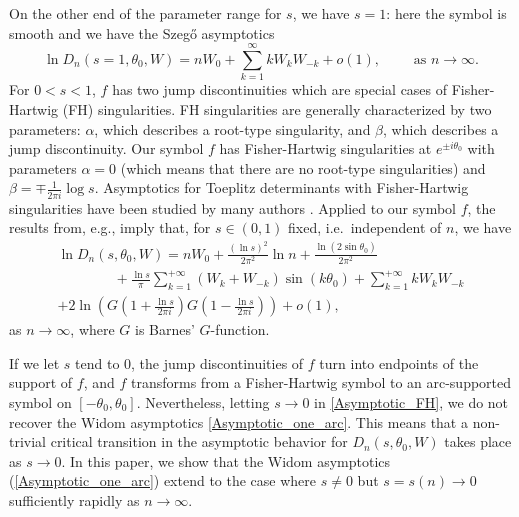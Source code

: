 \documentclass[11pt,fleqn]{article}
\numberwithin{equation}{section}
\begin{document}
On the other end of the parameter range for $s$, we have $s=1$: here the symbol is smooth and we have the Szeg\H{o} asymptotics
\begin{equation} \label{Asymptotic_Szego}
\ln D_n \left(s=1, \theta_{0}, W \right) = nW_0+\sum_{k=1}^{\infty}kW_kW_{-k}+ o(1), \qquad \mbox{ as } n \to \infty.
\end{equation}
For $0 < s < 1$, $f$ has two jump discontinuities which are special cases of Fisher-Hartwig (FH) singularities. FH singularities are generally characterized by two parameters: $\alpha$, which describes a root-type singularity, and $\beta$, which describes a jump discontinuity. Our symbol $f$ has Fisher-Hartwig singularities at $e^{\pm i\theta_0}$ with parameters $\alpha=0$ (which means that there are no root-type singularities) and $\beta=\mp \frac{1}{2\pi i} \log s$.
Asymptotics for Toeplitz determinants with Fisher-Hartwig singularities have been studied by many authors \cite{FH, W, Basor, Basor2, BS, Ehr, Deift2, DeiftItsKrasovsky}. Applied to our symbol $f$, the results from, e.g., \cite{Deift2} imply that, for $s\in (0,1)$ fixed, i.e.\ independent of $n$, we have
\begin{multline} \label{Asymptotic_FH}
\ln D_n \left(s,\theta_{0},W \right) = nW_0 + \frac{(\ln s)^2}{2 \pi^{2}}  \ln n +\frac{\ln(2\sin\theta_0)}{2\pi^2} \\
\qquad\qquad +\frac{\ln s}{\pi} \sum_{k=1}^{+\infty}(W_k+W_{-k}) \sin(k\theta_0) 
+ \sum_{k=1}^{+\infty}kW_kW_{-k}\\
+2\ln\left(G\left(1+\frac{\ln s}{2\pi i}\right)G\left(1-\frac{\ln s}{2\pi i}\right)\right) + o(1),
\end{multline}
as $n\to\infty$, where $G$ is Barnes' $G$-function.



If we let $s$ tend to $0$, the jump discontinuities of $f$ turn into endpoints of the support of $f$, and $f$ transforms from a Fisher-Hartwig symbol to an arc-supported symbol on $[-\theta_0,\theta_0]$. Nevertheless, letting $s\to 0$ in \eqref{Asymptotic_FH}, we do not recover the Widom asymptotics \eqref{Asymptotic_one_arc}. This means that a non-trivial critical transition in the asymptotic behavior for $D_n(s,\theta_0,W)$ takes place as $s\to 0$. In this paper, we show that the Widom asymptotics (\ref{Asymptotic_one_arc}) extend to the case where $s\neq 0$ but $s=s(n)\to 0$ sufficiently rapidly as $n\to\infty$. 
\end{document}
